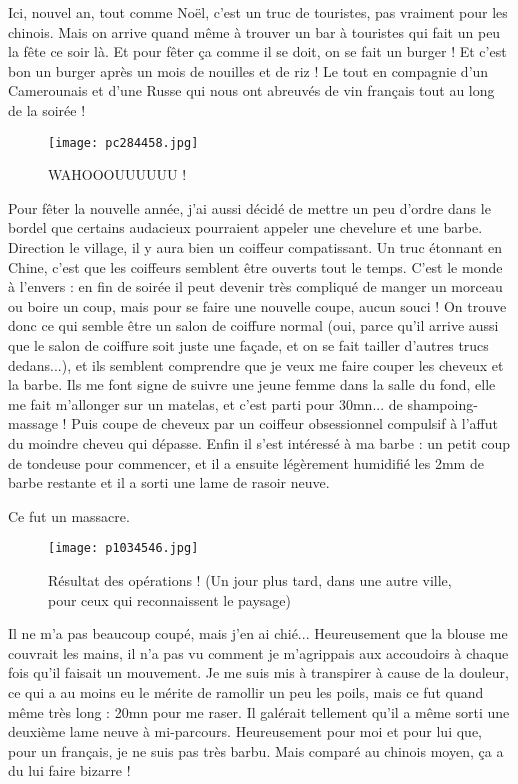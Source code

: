 \documentclass{book}
\begin{document}
Ici, nouvel an, tout comme Noël, c'est un truc de touristes, pas vraiment pour les chinois. Mais on arrive quand même à trouver un bar à touristes qui fait un peu la fête ce soir là. Et pour fêter ça comme il se doit, on se fait un burger ! Et c'est bon un burger après un mois de nouilles et de riz ! Le tout en compagnie d'un Camerounais et d'une Russe qui nous ont abreuvés de vin français tout au long de la soirée !


\begin{figure}[h]
\centering
\texttt{[image: pc284458.jpg]}
\caption*{WAHOOOUUUUUU !}
\end{figure}

Pour fêter la nouvelle année, j'ai aussi décidé de mettre un peu d'ordre dans le bordel que certains audacieux pourraient appeler une chevelure et une barbe. Direction le village, il y aura bien un coiffeur compatissant. Un truc étonnant en Chine, c'est que les coiffeurs semblent être ouverts tout le temps. C'est le monde à l'envers : en fin de soirée il peut devenir très compliqué de manger un morceau ou boire un coup, mais pour se faire une nouvelle coupe, aucun souci ! On trouve donc ce qui semble être un salon de coiffure normal (oui, parce qu'il arrive aussi que le salon de coiffure soit juste une façade, et on se fait tailler d'autres trucs dedans...), et ils semblent comprendre que je veux me faire couper les cheveux et la barbe. Ils me font signe de suivre une jeune femme dans la salle du fond, elle me fait m'allonger sur un matelas, et c'est parti pour 30mn... de shampoing- massage ! Puis coupe de cheveux par un coiffeur obsessionnel compulsif à l'affut du moindre cheveu qui dépasse. Enfin il s'est intéressé à ma barbe : un petit coup de tondeuse pour commencer, et il a ensuite légèrement humidifié les 2mm de barbe restante et il a sorti une lame de rasoir neuve.

Ce fut un massacre.


\begin{wrapfigure}{l}{0.55\textwidth}
\centering
\texttt{[image: p1034546.jpg]}
\caption*{Résultat des opérations ! (Un jour plus tard, dans une autre ville, pour ceux qui reconnaissent le paysage)}
\end{wrapfigure}


Il ne m'a pas beaucoup coupé, mais j'en ai chié... Heureusement que la blouse me couvrait les mains, il n'a pas vu comment je m'agrippais aux accoudoirs à chaque fois qu'il faisait un mouvement. Je me suis mis à transpirer à cause de la douleur, ce qui a au moins eu le mérite de ramollir un peu les poils, mais ce fut quand même très long : 20mn pour me raser. Il galérait tellement qu'il a même sorti une deuxième lame neuve à mi-parcours. Heureusement pour moi et pour lui que, pour un français, je ne suis pas très barbu. Mais comparé au chinois moyen, ça a du lui faire bizarre !
\end{document}
